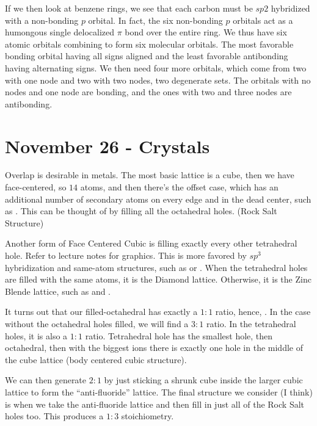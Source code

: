 \documentclass{report}
\begin{document}
If we then look at benzene rings, we see that each carbon must be $sp2$ hybridized with a non-bonding $p$ orbital. In fact, the six non-bonding $p$ orbitals act as a humongous single delocalized $\pi$ bond over the entire ring. We thus have six atomic orbitals combining to form six molecular orbitals. The most favorable bonding orbital having all signs aligned and the least favorable antibonding having alternating signs. We then need four more orbitals, which come from two with one node and two with two nodes, two degenerate sets. The orbitals with no nodes and one node are bonding, and the ones with two and three nodes are antibonding. 

\section{November 26 - Crystals}

Overlap is desirable in metals. The most basic lattice is a cube, then we have face-centered, so $14$ atoms, and then there's the offset case, which has an additional number of secondary atoms on every edge and in the dead center, such as . This can be thought of by filling all the octahedral holes. (Rock Salt Structure)

Another form of Face Centered Cubic is filling exactly every other tetrahedral hole. Refer to lecture notes for graphics. This is more favored by $sp^3$ hybridization and same-atom structures, such as  or . When the tetrahedral holes are filled with the same atoms, it is the Diamond lattice. Otherwise, it is the Zinc Blende lattice, such as  and . 

It turns out that our filled-octahedral has exactly a $1:1$ ratio, hence, . In the case without the octahedral holes filled, we will find a $3:1$ ratio. In the tetrahedral holes, it is also a $1:1$ ratio. Tetrahedral hole has the smallest hole, then octahedral, then with the biggest ions there is exactly one hole in the middle of the cube lattice (body centered cubic structure).

We can then generate $2:1$ by just sticking a shrunk cube inside the larger cubic lattice to form the ``anti-fluoride'' lattice. The final structure we consider (I think) is when we take the anti-fluoride lattice and then fill in just all of the Rock Salt holes too. This produces a $1:3$ stoichiometry. 
\end{document}
